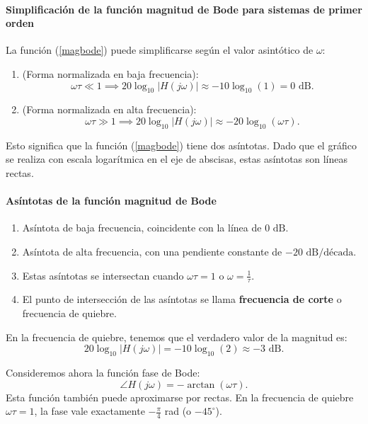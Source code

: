 \documentclass[11pt,a4paper,openany]{book}
\begin{document}
\paragraph{Simplificaci\'{o}n de la funci\'{o}n magnitud de Bode para sistemas de primer orden}
La funci\'{o}n (\ref{magbode}) puede simplificarse seg\'{u}n el valor asint\'{o}tico de $\omega$:
\begin{enumerate}
	\item (Forma normalizada en baja frecuencia):
	\begin{equation}
		\omega\tau \ll 1 \implies 20\log_{10} |H(j\omega)| \approx -10\log_{10}(1) = 0 \text{ dB}.
	\end{equation}
	
	\item (Forma normalizada en alta frecuencia):
	\begin{equation}
		\omega\tau \gg 1 \implies 20\log_{10} |H(j\omega)| \approx -20\log_{10}(\omega\tau).
	\end{equation}
\end{enumerate}
Esto significa que la funci\'{o}n (\ref{magbode}) tiene dos as\'{i}ntotas. Dado que el gr\'{a}fico se realiza con escala logar\'{i}tmica en el eje de abscisas, estas as\'{i}ntotas son líneas rectas.

\paragraph{As\'{i}ntotas de la funci\'{o}n magnitud de Bode}
\begin{enumerate}
	\item As\'{i}ntota de baja frecuencia, coincidente con la l\'{i}nea de $0 \text{ dB}$.
	\item As\'{i}ntota de alta frecuencia, con una pendiente constante de $-20 \text{ dB/d\'{e}cada}$.
	\item Estas as\'{i}ntotas se intersectan cuando $\omega\tau = 1$ o $\omega = \frac{1}{\tau}$.
	\item El punto de intersecci\'{o}n de las as\'{i}ntotas se llama \textbf{frecuencia de corte} o frecuencia de quiebre.
\end{enumerate}

En la frecuencia de quiebre, tenemos que el verdadero valor de la magnitud es:
\begin{equation}
	20\log_{10} |H(j\omega)| = -10\log_{10}(2) \approx -3 \text{ dB}.
\end{equation}

Consideremos ahora la funci\'{o}n fase de Bode:
\begin{equation}
	\angle H(j\omega) = -\arctan(\omega\tau). \label{faseBode}
\end{equation}
Esta funci\'{o}n tambi\'{e}n puede aproximarse por rectas. En la frecuencia de quiebre $\omega\tau = 1$, la fase vale exactamente $-\frac{\pi}{4}$ rad (o $-45^\circ$).
\end{document}
